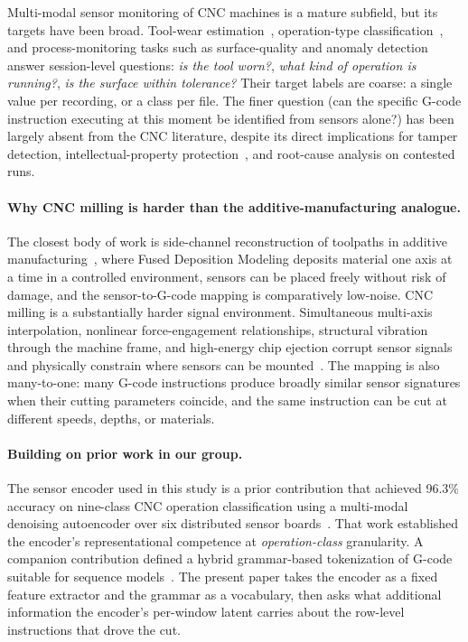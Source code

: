 \documentclass[sensors,article,submit,moreauthors,pdftex]{Definitions/mdpi}
\begin{document}
Multi-modal sensor monitoring of CNC machines is a mature subfield, but its targets have been broad. Tool-wear estimation~\cite{teti2010advanced,serin2020tool,zhu2009wavelet,mohanraj2020tool,wang2024multisensor}, operation-type classification~\cite{wang2018deep,zhao2019machine}, and process-monitoring tasks such as surface-quality and anomaly detection~\cite{stathatos2024cnn,coelho2024anomaly} answer session-level questions: \emph{is the tool worn?}, \emph{what kind of operation is running?}, \emph{is the surface within tolerance?} Their target labels are coarse: a single value per recording, or a class per file. The finer question (can the specific G-code instruction executing at this moment be identified from sensors alone?) has been largely absent from the CNC literature, despite its direct implications for tamper detection, intellectual-property protection~\cite{alfaruque2016acoustic,song2016my,chhetri2016kcad,jamarani2024screg,chattopadhyay2025video}, and root-cause analysis on contested runs.

\paragraph{Why CNC milling is harder than the additive-manufacturing analogue.} The closest body of work is side-channel reconstruction of toolpaths in additive manufacturing~\cite{alfaruque2016acoustic,song2016my,chhetri2016kcad}, where Fused Deposition Modeling deposits material one axis at a time in a controlled environment, sensors can be placed freely without risk of damage, and the sensor-to-G-code mapping is comparatively low-noise. CNC milling is a substantially harder signal environment. Simultaneous multi-axis interpolation, nonlinear force-engagement relationships, structural vibration through the machine frame, and high-energy chip ejection corrupt sensor signals and physically constrain where sensors can be mounted~\cite{teti2010advanced,wang2018deep}. The mapping is also many-to-one: many G-code instructions produce broadly similar sensor signatures when their cutting parameters coincide, and the same instruction can be cut at different speeds, depths, or materials.

\paragraph{Building on prior work in our group.} The sensor encoder used in this study is a prior contribution that achieved 96.3\% accuracy on nine-class CNC operation classification using a multi-modal denoising autoencoder over six distributed sensor boards~\cite{encoder_paper}. That work established the encoder's representational competence at \emph{operation-class} granularity. A companion contribution defined a hybrid grammar-based tokenization of G-code suitable for sequence models~\cite{grammar_paper}. The present paper takes the encoder as a fixed feature extractor and the grammar as a vocabulary, then asks what additional information the encoder's per-window latent carries about the row-level instructions that drove the cut.
\end{document}
